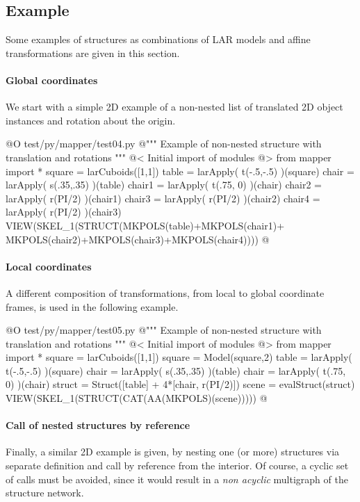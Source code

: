 \documentclass[11pt,oneside]{article}	%
\begin{document}
\subsection{Example}
Some examples of structures as combinations of LAR models and affine transformations are given in this section. 

\paragraph{Global coordinates}
We start with a simple 2D example of a non-nested list of translated 2D object instances and rotation about the origin.

@O test/py/mapper/test04.py
@{""" Example of non-nested structure with translation and rotations """
@< Initial import of modules @>
from mapper import *
square = larCuboids([1,1])
table = larApply( t(-.5,-.5) )(square)
chair = larApply( s(.35,.35) )(table)
chair1 = larApply( t(.75, 0) )(chair)
chair2 = larApply( r(PI/2) )(chair1)
chair3 = larApply( r(PI/2) )(chair2)
chair4 = larApply( r(PI/2) )(chair3)
VIEW(SKEL_1(STRUCT(MKPOLS(table)+MKPOLS(chair1)+
				   MKPOLS(chair2)+MKPOLS(chair3)+MKPOLS(chair4))))
@}

\paragraph{Local coordinates}
A different composition of transformations, from local to global coordinate frames, is used in the following example.

@O test/py/mapper/test05.py
@{""" Example of non-nested structure with translation and rotations """
@< Initial import of modules @>
from mapper import *
square = larCuboids([1,1])
square = Model(square,2)
table = larApply( t(-.5,-.5) )(square)
chair = larApply( s(.35,.35) )(table)
chair = larApply( t(.75, 0) )(chair)
struct = Struct([table] + 4*[chair, r(PI/2)])
scene = evalStruct(struct)
VIEW(SKEL_1(STRUCT(CAT(AA(MKPOLS)(scene)))))
@}

\paragraph{Call of nested structures by reference}
Finally, a similar 2D example is given, by nesting one (or more) structures via separate definition and call by reference from the interior. Of course, a cyclic set of calls must be avoided, since it would result in a \emph{non acyclic} multigraph of the structure network.
\end{document}
